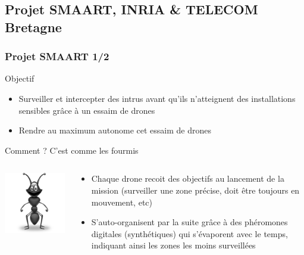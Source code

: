 \documentclass{beamer}
\begin{document}
\subsection{Projet SMAART, INRIA \& TELECOM Bretagne}
\begin{frame}
  \frametitle{Projet SMAART 1/2}
  \begin{block}{Objectif}
    \begin{itemize}
      \item Surveiller et intercepter des intrus avant qu'ils n'atteignent des installations sensibles grâce à un essaim de drones
      \item Rendre au maximum autonome cet essaim de drones
    \end{itemize}
  \end{block}
  \begin{block}{Comment ? C'est comme les fourmis}
    \begin{columns}
      \begin{column}{.2\textwidth}
        \begin{center}
          \includegraphics[width=\textwidth]{../Images/fourmis.png}
        \end{center}
      \end{column}
      \begin{column}{.8\textwidth}
        \begin{itemize}
          \item Chaque drone recoit des objectifs au lancement de la mission (surveiller une zone précise, doit être toujours en mouvement, etc)
          \item S'auto-organisent par la suite grâce à des phéromones digitales (synthétiques) qui s'évaporent avec le temps, indiquant ainsi les zones les moins surveillées
        \end{itemize}
      \end{column}
    \end{columns}
  \end{block}
\end{frame}
\end{document}
